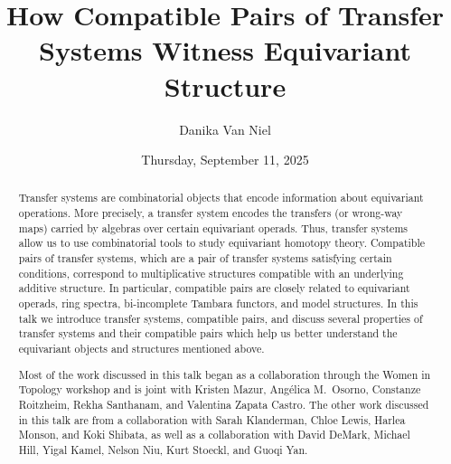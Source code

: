 \documentclass{UAmathtalk}
\author{Danika Van Niel}
\title{How Compatible Pairs of Transfer Systems Witness Equivariant Structure}
\date{Thursday, September 11, 2025}
\begin{document}
\maketitle

\vspace{-\smallskipamount}
\begin{abstract}
Transfer systems are combinatorial objects that encode information about equivariant operations. More precisely, a transfer system encodes the transfers (or wrong-way maps) carried by algebras over certain equivariant operads. Thus, transfer systems allow us to use combinatorial tools to study equivariant homotopy theory. Compatible pairs of transfer systems, which are a pair of transfer systems satisfying certain conditions, correspond to multiplicative structures compatible with an underlying additive structure. In particular, compatible pairs are closely related to equivariant operads, ring spectra, bi-incomplete Tambara functors, and model structures. In this talk we introduce transfer systems, compatible pairs, and discuss several properties of transfer systems and their compatible pairs which help us better understand the equivariant objects and structures mentioned above.

Most of the work discussed in this talk began as a collaboration through the Women in Topology workshop and is joint with Kristen Mazur, Angélica M.\ Osorno, Constanze Roitzheim, Rekha Santhanam, and Valentina Zapata Castro. The other work discussed in this talk are from a collaboration with Sarah Klanderman, Chloe Lewis, Harlea Monson, and Koki Shibata, as well as a collaboration with David DeMark, Michael Hill, Yigal Kamel, Nelson Niu, Kurt Stoeckl, and Guoqi Yan.
\end{abstract}
\end{document}
